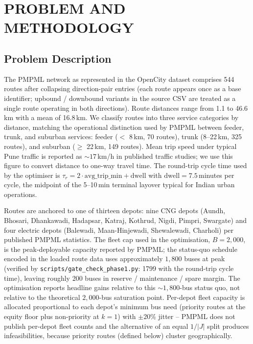 \documentclass[a4paper,twoside]{article}
\begin{document}
\section{\uppercase{Problem and Methodology}}
\label{sec:method}

\subsection{Problem Description}
\label{sec:problem}

The PMPML network as represented in the OpenCity dataset
\cite{opencity2024pmpml} comprises 544 routes after collapsing
direction-pair entries (each route appears once as a base
identifier; upbound / downbound variants in the source CSV are
treated as a single route operating in both directions). Route
distances range from 1.1 to 46.6\,km with a mean of 16.8\,km. We
classify routes into three service categories by distance,
matching the operational distinction used by PMPML between feeder,
trunk, and suburban services: feeder ($<$ 8\,km, 70 routes),
trunk (8--22\,km, 325 routes), and suburban ($\geq$ 22\,km, 149
routes). Mean trip speed under typical Pune traffic is reported
as $\sim 17$\,km/h in published traffic studies; we use this
figure to convert distance to one-way travel time. The
round-trip cycle time used by the optimiser is
$\tau_r = 2 \cdot \mathrm{avg\_trip\_min} + \mathrm{dwell}$ with
$\mathrm{dwell} = 7.5$\,minutes per cycle, the midpoint of the
5--10\,min terminal layover typical for Indian urban operations.

Routes are anchored to one of thirteen depots: nine CNG depots
(Aundh, Bhosari, Dhankawadi, Hadapsar, Katraj, Kothrud, Nigdi,
Pimpri, Swargate) and four electric depots (Balewadi,
Maan-Hinjewadi, Shewalewadi, Charholi) per published PMPML
statistics. The fleet cap used in the optimisation, $B = 2{,}000$,
is the peak-deployable capacity reported by PMPML; the
status-quo schedule encoded in the loaded route data uses
approximately $1{,}800$ buses at peak (verified by
\texttt{scripts/gate\_check\_phase1.py}: 1799 with the round-trip
cycle time), leaving roughly 200 buses in reserve / maintenance /
spare margin. The optimisation reports headline gains relative to
this $\sim 1{,}800$-bus status quo, not relative to the
theoretical $2{,}000$-bus saturation point. Per-depot fleet
capacity is allocated proportional to each depot's minimum bus
need (priority routes at the equity floor plus non-priority at
$k = 1$) with $\pm 20\%$ jitter -- PMPML does not publish
per-depot fleet counts and the alternative of an equal $1/|J|$
split produces infeasibilities, because priority
routes (defined below) cluster geographically.
\end{document}
